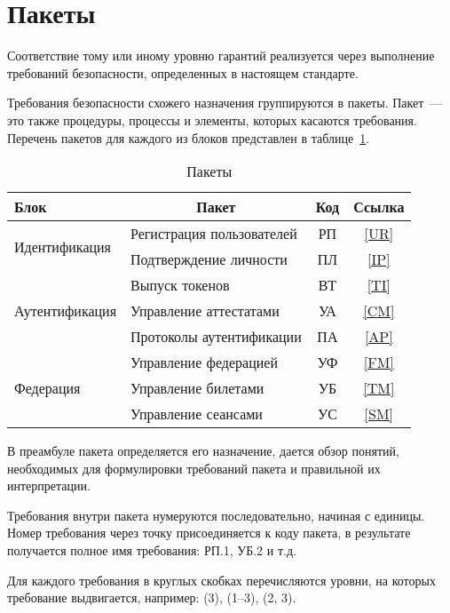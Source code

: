 \section{Пакеты}\label{COMMON.Packets}

Соответствие тому или иному уровню гарантий реализуется через выполнение 
требований безопасности, определенных в настоящем стандарте.

Требования безопасности схожего назначения группируются в пакеты. 
Пакет~--- это также процедуры, процессы и элементы, которых касаются требования.
%
Перечень пакетов для каждого из блоков представлен в таблице~\ref{Table.COMMON.Packages}.

\begin{table}[hbt]
\caption{Пакеты}\label{Table.COMMON.Packages}
\begin{tabular}{|l|l|c|c|}
\hline
Блок & \multicolumn{1}{c|}{Пакет} & Код & Ссылка\\
\hline
\hline
\multirow{2}{*}{Идентификация} 
  & Регистрация пользователей & РП & \ref{UR}\\
  & Подтверждение личности    & ПЛ & \ref{IP}\\
\hline
\hline
\multirow{3}{*}{Аутентификация} 
  & Выпуск токенов            & ВТ & \ref{TI}\\
  & Управление аттестатами    & УА & \ref{CM}\\
  & Протоколы аутентификации  & ПА & \ref{AP}\\
\hline
\hline
\multirow{3}{*}{Федерация} 
  & Управление федерацией     & УФ & \ref{FM}\\
  & Управление билетами       & УБ & \ref{TM}\\
  & Управление сеансами       & УС & \ref{SM}\\
\hline
\end{tabular}
\end{table}

В преамбуле пакета определяется его назначение, дается обзор понятий, 
необходимых для формулировки требований пакета и правильной их интерпретации. 

Требования внутри пакета нумеруются последовательно, начиная с единицы. Номер
требования через точку присоединяется к коду пакета, в результате получается полное
имя требования: РП.1, УБ.2 и т.д.

Для каждого требования в круглых скобках перечисляются уровни, на которых 
требование выдвигается, например: (3), (1–3), (2, 3). 


